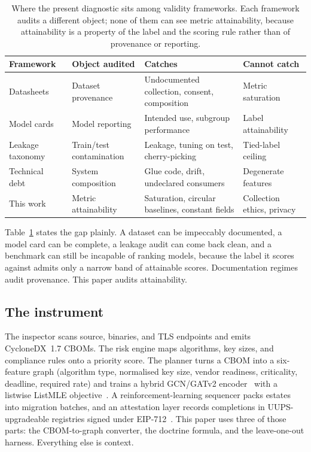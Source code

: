\documentclass[journal,10pt]{IEEEtran}
\begin{document}
\begin{table}[t]
\centering
\caption{Where the present diagnostic sits among validity frameworks. Each framework audits a
different object; none of them can see metric attainability, because attainability is a property
of the label and the scoring rule rather than of provenance or reporting.}
\label{tab:frameworks}
\scriptsize
\setlength{\tabcolsep}{3.5pt}
\begin{tabular}{@{}>{\raggedright\arraybackslash}p{1.75cm}>{\raggedright\arraybackslash}p{2.05cm}>{\raggedright\arraybackslash}p{2.15cm}>{\raggedright\arraybackslash}p{1.9cm}@{}}
\toprule
Framework & Object audited & Catches & Cannot catch \\
\midrule
Datasheets~\cite{gebru2021} & Dataset provenance & Undocumented collection, consent, composition & Metric saturation \\
Model cards~\cite{mitchell2019} & Model reporting & Intended use, subgroup performance & Label attainability \\
Leakage taxonomy~\cite{kapoor2023} & Train/test contamination & Leakage, tuning on test, cherry-picking & Tied-label ceiling \\
Technical debt~\cite{sculley2015} & System composition & Glue code, drift, undeclared consumers & Degenerate features \\
This work & Metric attainability & Saturation, circular baselines, constant fields & Collection ethics, privacy \\
\bottomrule
\end{tabular}
\end{table}

Table~\ref{tab:frameworks} states the gap plainly. A dataset can be impeccably documented, a model
card can be complete, a leakage audit can come back clean, and a benchmark can still be incapable
of ranking models, because the label it scores against admits only a narrow band of attainable
scores. Documentation regimes audit provenance. This paper audits attainability.

\subsection{The instrument}

The inspector scans source, binaries, and TLS endpoints and emits CycloneDX~1.7 CBOMs. The risk
engine maps algorithms, key sizes, and compliance rules onto a priority score. The planner turns a
CBOM into a six-feature graph (algorithm type, normalised key size, vendor readiness, criticality,
deadline, required rate) and trains a hybrid GCN/GATv2 encoder~\cite{kipf2017,gatv2} with a listwise
ListMLE objective~\cite{listmle}. A reinforcement-learning sequencer packs estates into migration
batches, and an attestation layer records completions in UUPS-upgradeable registries signed under
EIP-712~\cite{eip712,base}. This paper uses three of those parts: the CBOM-to-graph converter, the
doctrine formula, and the leave-one-out harness. Everything else is context.
\end{document}
